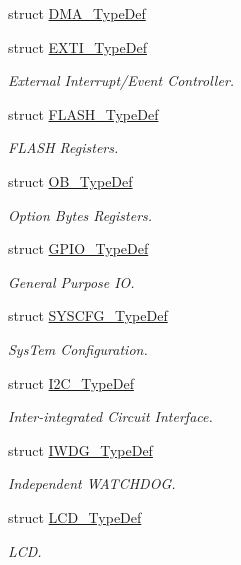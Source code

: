 \begin{DoxyCompactItemize}
struct \hyperlink{struct_d_m_a___type_def}{D\-M\-A\-\_\-\-Type\-Def}
\item 
struct \hyperlink{struct_e_x_t_i___type_def}{E\-X\-T\-I\-\_\-\-Type\-Def}
\begin{DoxyCompactList}\small\item\em External Interrupt/\-Event Controller. \end{DoxyCompactList}\item 
struct \hyperlink{struct_f_l_a_s_h___type_def}{F\-L\-A\-S\-H\-\_\-\-Type\-Def}
\begin{DoxyCompactList}\small\item\em F\-L\-A\-S\-H Registers. \end{DoxyCompactList}\item 
struct \hyperlink{struct_o_b___type_def}{O\-B\-\_\-\-Type\-Def}
\begin{DoxyCompactList}\small\item\em Option Bytes Registers. \end{DoxyCompactList}\item 
struct \hyperlink{struct_g_p_i_o___type_def}{G\-P\-I\-O\-\_\-\-Type\-Def}
\begin{DoxyCompactList}\small\item\em General Purpose I\-O. \end{DoxyCompactList}\item 
struct \hyperlink{struct_s_y_s_c_f_g___type_def}{S\-Y\-S\-C\-F\-G\-\_\-\-Type\-Def}
\begin{DoxyCompactList}\small\item\em Sys\-Tem Configuration. \end{DoxyCompactList}\item 
struct \hyperlink{struct_i2_c___type_def}{I2\-C\-\_\-\-Type\-Def}
\begin{DoxyCompactList}\small\item\em Inter-\/integrated Circuit Interface. \end{DoxyCompactList}\item 
struct \hyperlink{struct_i_w_d_g___type_def}{I\-W\-D\-G\-\_\-\-Type\-Def}
\begin{DoxyCompactList}\small\item\em Independent W\-A\-T\-C\-H\-D\-O\-G. \end{DoxyCompactList}\item 
struct \hyperlink{struct_l_c_d___type_def}{L\-C\-D\-\_\-\-Type\-Def}
\begin{DoxyCompactList}\small\item\em L\-C\-D. \end{DoxyCompactList}\item 

\end{DoxyCompactItemize}
